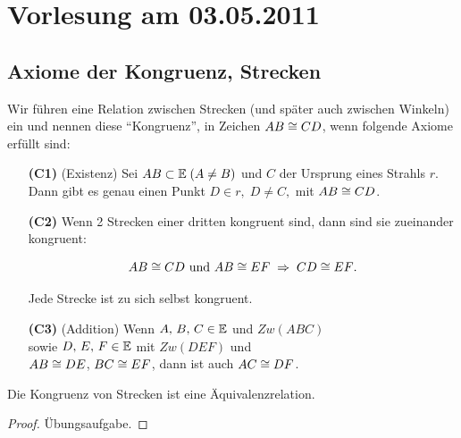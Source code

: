 \section*{Vorlesung am 03.05.2011}

\subsection*{Axiome der Kongruenz, Strecken}

Wir führen eine Relation zwischen Strecken (und später auch zwischen Winkeln) ein und nennen diese
"`Kongruenz"', in Zeichen ${AB} \cong {CD}$, wenn folgende Axiome erfüllt sind: 

\begin{enumerate}
    \item[{\bf (C1)}] (Existenz) Sei ${AB} \subset \mathbb E\; (A \neq B)$ und $C$ der Ursprung eines
        Strahls $r$. Dann gibt es genau einen Punkt $D \in r,\; D \neq C,$ mit ${AB} \cong
        {CD}$.


    \item[{\bf (C2)}] Wenn 2 Strecken einer dritten kongruent sind, dann sind sie zueinander kongruent:

        $$
            {AB} \cong {CD} \mbox{ und } {AB} \cong {EF}\; \Rightarrow\; {CD} \cong {EF}.
        $$

        Jede Strecke ist zu sich selbst kongruent.

    \item[{\bf (C3)}] (Addition) Wenn $A,\,B,\,C\in \mathbb E$ und $Zw(ABC)$\\
        sowie $D,\, E,\, F \in \mathbb E$ mit $Zw(DEF)$ und\\
        ${AB} \cong {DE}$, ${BC} \cong {EF}$, dann ist auch ${AC} \cong
        {DF}$.

\end{enumerate}

\begin{thm}\label{thm:satz.s1d}
    Die Kongruenz von Strecken ist eine Äquivalenzrelation.
\end{thm}

\begin{proof}
    Übungsaufgabe.
\end{proof}

